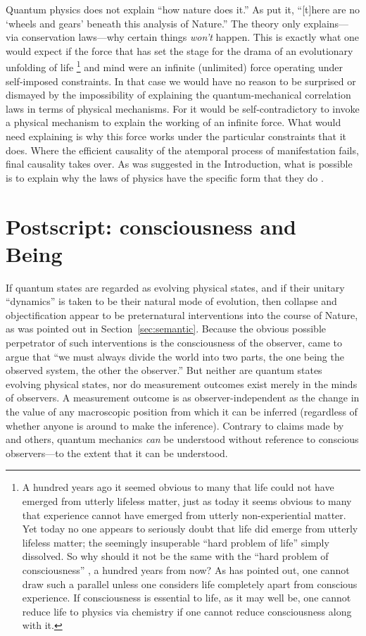 Quantum physics does not explain ``how nature does it.'' As \citet[p.~78]{FeynmanQED} put it, ``[t]here are no `wheels and gears' beneath this analysis of Nature.'' The theory only explains---via conservation laws---why certain things \emph{won't} happen. This is exactly what one would expect if the force that has set the stage for the drama of an evolutionary unfolding of life%
\footnote{A hundred years ago it seemed obvious to many that life could not have emerged from utterly lifeless matter, just as today it seems obvious to many that experience cannot have emerged from utterly non-experiential matter. Yet today no one appears to seriously doubt that life did emerge from utterly lifeless matter; the seemingly insuperable ``hard problem of life'' simply dissolved. So why should it not be the same with the ``hard problem of consciousness'' \citep{Chalmers}, a hundred years from now? As \citet{Strawson} has pointed out, one cannot draw such a parallel unless one considers life completely apart from conscious experience. If consciousness is essential to life, as it may well be, one cannot reduce life to physics via chemistry if one cannot reduce consciousness along with it.}
and mind were an infinite (unlimited) force operating under self-imposed constraints. In that case we would have no reason to be surprised or dismayed by the impossibility of explaining the quantum-mechanical correlation laws in terms of physical mechanisms. For it would be self-contradictory to invoke a physical mechanism to explain the working of an infinite force. What would need explaining is why this force works under the particular constraints that it does. Where the efficient causality of the atemporal process of manifestation fails, final causality takes over. As was suggested in the Introduction, what is possible is to explain why the laws of physics have the specific form that they do \citep{Mohrhoff2002,Mohrhoff2009b,Mohrhoff2011}.

\section{Postscript: consciousness and Being }\label{sca}
If quantum states are regarded as evolving physical states, and if their unitary ``dynamics'' is taken to be their natural mode of evolution, then collapse and objectification appear to be preternatural interventions into the course of Nature, as was pointed out in Section~\ref{sec:semantic}. Because the obvious possible perpetrator of such interventions is the consciousness of the observer, \citet{vonNeumann} came to argue that ``we must always divide the world into two parts, the one being the observed system, the other the observer.'' But neither are quantum states evolving physical states, nor do measurement outcomes exist merely in the minds of observers. A measurement outcome is as observer-independent as the change in the value of any macroscopic position from which it can be inferred (regardless of whether anyone is around to make the inference). Contrary to claims made by \citet{Stapp2011} and others, quantum mechanics \emph{can} be understood without reference to conscious observers---to the extent that it can be understood.

